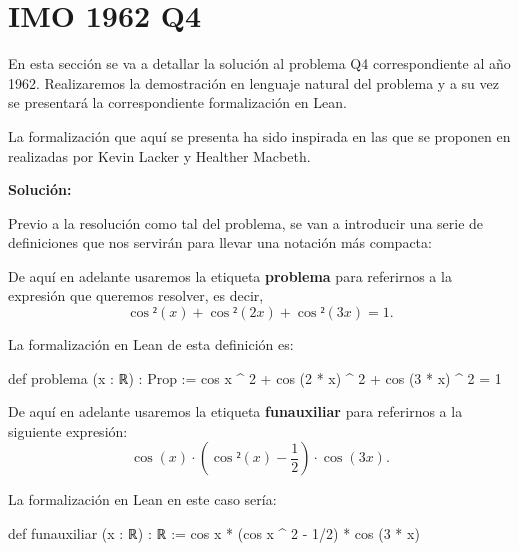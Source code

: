 \section{IMO 1962 Q4}

En esta sección se va a detallar la solución al problema Q4
correspondiente al año 1962. Realizaremos la demostración
en lenguaje natural del problema y a su vez se presentará la
correspondiente formalización en Lean.

La formalización que aquí se presenta ha sido inspirada en
las que se proponen en \cite{KLHM} realizadas por Kevin Lacker y
Healther Macbeth.



\noindent
{}

\textbf{Solución:}

Previo a la resolución como tal del problema, se van a
introducir una serie de definiciones que nos servirán
para llevar una notación más compacta:

\begin{definicion}\label{problema}
  De aquí en adelante usaremos la etiqueta \textbf{problema}
  para referirnos a la expresión que queremos resolver,
  es decir,
  \begin{equation}\label{expresionprob}
    \cos²(x)+\cos²(2x)+\cos²(3x)=1.
  \end{equation}
\end{definicion}

La formalización en Lean de esta definición es:
\begin{leancode}
 def problema (x : ℝ) : Prop :=
 cos x ^ 2 + cos (2 * x) ^ 2 + cos (3 * x) ^ 2 = 1
\end{leancode}

\begin{definicion}\label{funaux}
  De aquí en adelante usaremos la etiqueta
  \textbf{funauxiliar} para referirnos a la siguiente
  expresión:
  \begin{equation*}
    \cos(x)·(\cos²(x)-\frac{1}{2})·\cos(3x).
  \end{equation*}
\end{definicion}

La formalización en Lean en este caso sería:
\begin{leancode}
def funauxiliar (x : ℝ) : ℝ :=
cos x * (cos x ^ 2 - 1/2) * cos (3 * x)
\end{leancode}

